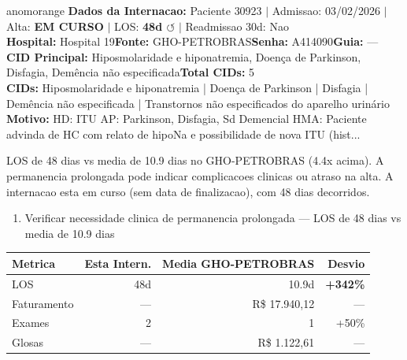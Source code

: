 \documentclass[a4paper,10pt]{article}
\begin{document}
\begin{anomalycard}[Internacao 164373 | GHO-PETROBRAS | ALTO (z=3.38)]{anomorange}
\textbf{Dados da Internacao:} Paciente 30923 $\mid$ Admissao: 03/02/2026 $\mid$ Alta: \textcolor{anomorange}{\textbf{EM CURSO}} $\mid$ LOS: \textbf{48d \textcolor{anomorange}{$\circlearrowleft$}} $\mid$ Readmissao 30d: Nao\\
\textbf{Hospital:} Hospital 19\quad\textbf{Fonte:} GHO-PETROBRAS\quad\textbf{Senha:} A414090\quad\textbf{Guia:} ---\\
\textbf{CID Principal:} {\small Hiposmolaridade e hiponatremia, Doença de Parkinson, Disfagia, Demência não especificada}\quad\textbf{Total CIDs:} 5\\

\textbf{CIDs:} {\scriptsize Hiposmolaridade e hiponatremia | Doença de Parkinson | Disfagia | Demência não especificada | Transtornos não especificados do aparelho urinário}\\

\textbf{Motivo:} {\scriptsize HD: ITU AP: Parkinson, Disfagia, Sd Demencial HMA: Paciente advinda de HC com relato de hipoNa e possibilidade de nova ITU (hist...}\\

\vspace{2pt}\begin{tcolorbox}[colback=severityred!20,colframe=anomorange,title={\textbf{Interpretacao de Negocio}},fonttitle=\bfseries\small,left=4pt,right=4pt,top=3pt,bottom=3pt]
{\small LOS de 48 dias vs media de 10.9 dias no GHO-PETROBRAS (4.4x acima). A permanencia prolongada pode indicar complicacoes clinicas ou atraso na alta. A internacao esta em curso (sem data de finalizacao), com 48 dias decorridos.}
\end{tcolorbox}
\begin{tcolorbox}[colback=severityyellow!30,colframe=anomorange,title={\textbf{Recomendacoes Especificas}},fonttitle=\bfseries\small,left=4pt,right=4pt,top=3pt,bottom=3pt]
\begin{enumerate}[nosep,leftmargin=16pt]
\item {\small Verificar necessidade clinica de permanencia prolongada --- LOS de 48 dias vs media de 10.9 dias}
\end{enumerate}
\end{tcolorbox}
\begin{center}\begin{tabular}{l r r r}\toprule\textbf{Metrica} & \textbf{Esta Intern.} & \textbf{Media GHO-PETROBRAS} & \textbf{Desvio} \\\midrule
LOS & 48d & 10.9d & \textcolor{anomred}{\textbf{+342\%}} \\
Faturamento & --- & R\$ 17.940,12 & --- \\
Exames & 2 & 1 & \textcolor{anomorange}{+50\%} \\
Glosas & --- & R\$ 1.122,61 & --- \\
\bottomrule\end{tabular}\end{center}


\end{anomalycard}
\end{document}
